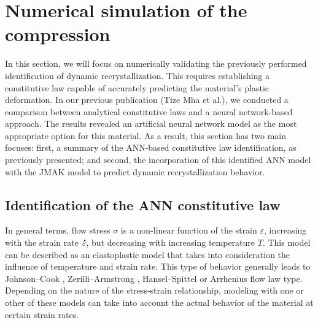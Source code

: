 \documentclass[metals,article,submit,pdftex,moreauthors]{Definitions/mdpi}
\makeatletter
\DeclareRobustCommand{\mdot}[1]{\accentset{\mbox{\bfseries .}}{#1}}
\DeclareRobustCommand{\eal}{et al.\@\xspace}
\makeatother
\begin{document}
\section{Numerical simulation of the compression\label{sec:NumSim}}

In this section, we will focus on numerically validating the previously performed identification of dynamic recrystallization.
This requires establishing a constitutive law capable of accurately predicting the material's plastic deformation.
In our previous publication (Tize Mha \eal \cite{TizeMha-2023}), we conducted a comparison between analytical constitutive laws and a neural network-based approach.
The results revealed an artificial neural network model as the most appropriate option for this material.
As a result, this section has two main focuses: first, a summary of the ANN-based constitutive law identification, as previously presented; and second, the incorporation of this identified ANN model with the JMAK model to predict dynamic recrystallization behavior.

\subsection{Identification of the ANN constitutive law\label{subsec:ANNConstitutiveLaw}}

In general terms, flow stress $\sigma$ is a non-linear function of the strain $\varepsilon$, increasing with the strain rate $\mdot\varepsilon$, but decreasing with increasing temperature $T$.
This model can be described as an elastoplastic model that takes into consideration the influence of temperature and strain rate.
This type of behavior generally leads to Johnson--Cook \cite{Johnson-1983}, Zerilli--Armstrong \cite{Zerilli-1987}, Hansel--Spittel \cite{Hensel-1978} or Arrhenius \cite{Sellars-1966} flow law type.
Depending on the nature of the stress-strain relationship, modeling with one or other of these models can take into account the actual behavior of the material at certain strain rates.
\end{document}
